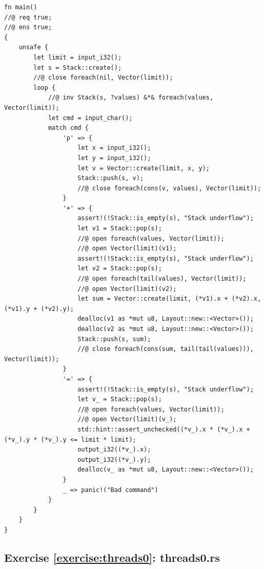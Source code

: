 \documentclass{article}
\begin{document}
\begin{lstlisting}
fn main()
//@ req true;
//@ ens true;
{
    unsafe {
        let limit = input_i32();
        let s = Stack::create();
        //@ close foreach(nil, Vector(limit));
        loop {
            //@ inv Stack(s, ?values) &*& foreach(values, Vector(limit));
            let cmd = input_char();
            match cmd {
                'p' => {
                    let x = input_i32();
                    let y = input_i32();
                    let v = Vector::create(limit, x, y);
                    Stack::push(s, v);
                    //@ close foreach(cons(v, values), Vector(limit));
                }
                '+' => {
                    assert!(!Stack::is_empty(s), "Stack underflow");
                    let v1 = Stack::pop(s);
                    //@ open foreach(values, Vector(limit));
                    //@ open Vector(limit)(v1);
                    assert!(!Stack::is_empty(s), "Stack underflow");
                    let v2 = Stack::pop(s);
                    //@ open foreach(tail(values), Vector(limit));
                    //@ open Vector(limit)(v2);
                    let sum = Vector::create(limit, (*v1).x + (*v2).x, (*v1).y + (*v2).y);
                    dealloc(v1 as *mut u8, Layout::new::<Vector>());
                    dealloc(v2 as *mut u8, Layout::new::<Vector>());
                    Stack::push(s, sum);
                    //@ close foreach(cons(sum, tail(tail(values))), Vector(limit));
                }
                '=' => {
                    assert!(!Stack::is_empty(s), "Stack underflow");
                    let v_ = Stack::pop(s);
                    //@ open foreach(values, Vector(limit));
                    //@ open Vector(limit)(v_);
                    std::hint::assert_unchecked((*v_).x * (*v_).x + (*v_).y * (*v_).y <= limit * limit);
                    output_i32((*v_).x);
                    output_i32((*v_).y);
                    dealloc(v_ as *mut u8, Layout::new::<Vector>());
                }
                _ => panic!("Bad command")
            }
        }
    }
}
\end{lstlisting}

\subsection{Exercise \ref{exercise:threads0}:
threads0.rs}\label{solution:threads0}
\end{document}
